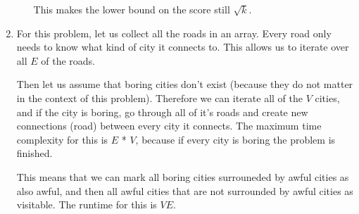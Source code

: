 \documentclass[12pt]{article}
\begin{document}
\begin{enumerate}
\begin{enumerate}
        This makes the lower bound on the score still $\sqrt{k}$.

    \end{enumerate}

\pagebreak

\item 
    For this problem, let us collect all the roads in an array. Every road only needs to know what kind of city it connects to.
    This allows us to iterate over all $E$ of the roads.

    Then let us assume that boring cities don't exist (because they do not matter in the context of this problem).
    Therefore we can iterate all of the $V$ cities, and if the city is boring, go through all of it's roads and create new connections (road)
    between every city it connects. The maximum time complexity for this is $E$ * $V$, because if every city is boring the problem is finished.

    This means that we can mark all boring cities surrouneded by awful cities as also awful, and then all awful cities that are not surrounded 
    by awful cities as visitable. The runtime for this is $VE$.


\end{enumerate}
\end{document}
